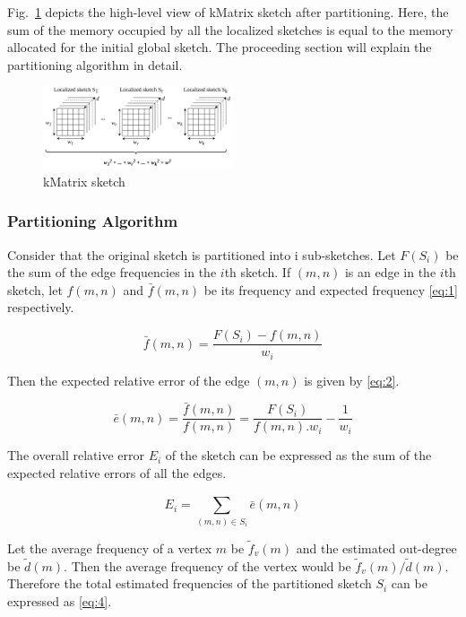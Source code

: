 Fig.~\ref{fig:kmatrix} depicts the high-level view of kMatrix sketch after partitioning. Here, the sum of the memory occupied by all the localized sketches is equal to the memory allocated for the initial global sketch. The proceeding section will explain the partitioning algorithm in detail. 

\begin{figure}[htbp]
    \centerline{\includegraphics[width=0.5\textwidth]{img/kmatrix.png}}
    \caption{kMatrix sketch}
    \label{fig:kmatrix}
\end{figure}

\subsubsection*{Partitioning Algorithm}

Consider that the original sketch is partitioned into i sub-sketches. Let \(F(S_i)\) be the sum of the edge frequencies in the \(i\)th sketch. If \((m,n)\) is an edge in the \(i\)th sketch, let \(f(m,n)\) and \(\bar{f}(m,n)\) be its frequency and expected frequency \eqref{eq:1} respectively. 

\begin{equation}
    \bar{f}(m,n) = \frac{F(S_i) - f(m,n)}{w_i}
    \label{eq:1}
\end{equation}

Then the expected relative error of the edge \((m,n)\) is given by \eqref{eq:2}.

\begin{equation}
    \bar{e}(m,n) = \frac{\bar{f}(m,n)}{f(m,n)} = \frac{F(S_i)}{f(m,n) . w_i} - \frac{1}{w_i}
    \label{eq:2}
\end{equation}

The overall relative error \(E_i\) of the sketch can be expressed as the sum of the expected relative errors of all the edges.

\begin{equation}
    E_i = \sum_{(m,n) \in S_i}^{} \bar{e}(m,n)
    \label{eq:3}
\end{equation}

Let the average frequency of a vertex \(m\) be \(\tilde{f}_v(m)\) and the estimated out-degree be \(\tilde{d}(m)\). Then the average frequency of the vertex would be \( \tilde{f}_v(m) / \tilde{d}(m) \). Therefore the total estimated frequencies of the partitioned sketch \(S_i\) can be expressed as \eqref{eq:4}.

